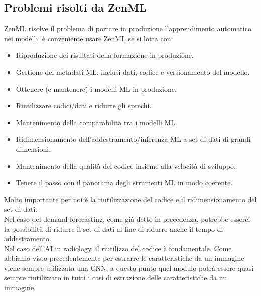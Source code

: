\documentclass[12pt,a4paper]{report}
\begin{document}
\subsection{Problemi risolti da ZenML}
ZenML risolve il problema di portare in produzione l'apprendimento automatico nei modelli. è conveniente usare ZenML se si lotta con: \cite{ZenML}
\begin{itemize}
    \item Riproduzione dei risultati della formazione in produzione.
    \item Gestione dei metadati ML, inclusi dati, codice e versionamento del modello.
    \item Ottenere (e mantenere) i modelli ML in produzione.
    \item Riutilizzare codici/dati e ridurre gli sprechi.
    \item Mantenimento della comparabilità tra i modelli ML.
    \item Ridimensionamento dell'addestramento/inferenza ML a set di dati di grandi dimensioni.
    \item Mantenimento della qualità del codice insieme alla velocità di sviluppo.
    \item Tenere il passo con il panorama degli strumenti ML in modo coerente.
\end{itemize}

Molto importante per noi è la riutilizzazione del codice e il ridimensionamento del set di dati.\\
Nel caso del demand forecasting, come già detto in precedenza, potrebbe esserci la possibilità di ridurre il set di dati al fine di ridurre anche il tempo di addestramento.\\
Nel caso dell'AI in radiology, il riutilizzo del codice è fondamentale. Come abbiamo visto precedentemente per estrarre le caratteristiche da un immagine viene sempre utilizzata una CNN, a questo punto quel modulo potrà essere quasi sempre riutilizzato in tutti i casi di estrazione delle caratteristiche da un immagine.\\
\end{document}
